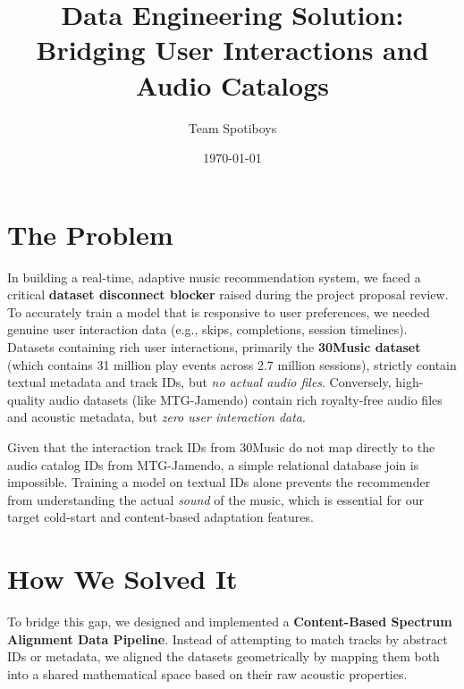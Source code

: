 \documentclass[12pt, letterpaper]{article}
\title{Data Engineering Solution: Bridging User Interactions and Audio Catalogs}
\author{Team Spotiboys}
\date{\today}
\begin{document}
\maketitle

\section{The Problem}
In building a real-time, adaptive music recommendation system, we faced a critical \textbf{dataset disconnect blocker} raised during the project proposal review. To accurately train a model that is responsive to user preferences, we needed genuine user interaction data (e.g., skips, completions, session timelines). Datasets containing rich user interactions, primarily the \textbf{30Music dataset} (which contains 31 million play events across 2.7 million sessions), strictly contain textual metadata and track IDs, but \textit{no actual audio files}. Conversely, high-quality audio datasets (like MTG-Jamendo) contain rich royalty-free audio files and acoustic metadata, but \textit{zero user interaction data}. 

Given that the interaction track IDs from 30Music do not map directly to the audio catalog IDs from MTG-Jamendo, a simple relational database join is impossible. Training a model on textual IDs alone prevents the recommender from understanding the actual \textit{sound} of the music, which is essential for our target cold-start and content-based adaptation features.

\section{How We Solved It}
To bridge this gap, we designed and implemented a \textbf{Content-Based Spectrum Alignment Data Pipeline}. Instead of attempting to match tracks by abstract IDs or metadata, we aligned the datasets geometrically by mapping them both into a shared mathematical space based on their raw acoustic properties. 
\end{document}
